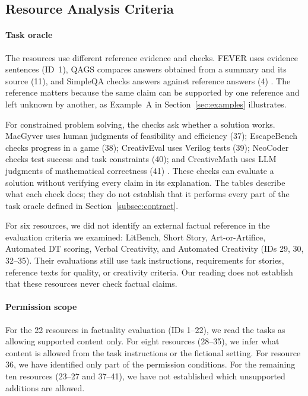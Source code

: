 \documentclass{clv2025}
\begin{document}
\subsection{Resource Analysis Criteria}\label{sec:mapping}

\paragraph{Task oracle}
The resources use different reference evidence and checks. FEVER uses
evidence sentences (ID~1), QAGS compares answers obtained from a summary
and its source (11), and SimpleQA checks answers against reference answers
(4) \citep{thorne_fever_2018,wang_asking_2020,wei_measuring_2024}.
The reference matters because the same claim can be supported by one
reference and left unknown by another, as Example~A in
Section~\ref{sec:examples} illustrates.

For constrained problem solving, the checks ask whether a solution works.
MacGyver uses human judgments of feasibility and efficiency (37);
EscapeBench checks progress in a game (38); CreativEval uses Verilog tests
(39); NeoCoder checks test success and task constraints (40); and
CreativeMath uses LLM judgments of mathematical correctness (41)
\citep{tian_macgyver_2025,qian_escapebench_2025,delorenzo_creativeval_2024,
lu_benchmarking_2025,ye_assessing_2025}. These checks can evaluate a solution
without verifying every claim in its explanation. The tables describe
what each check does; they do not establish that it performs every part
of the task oracle defined in Section~\ref{subsec:contract}.

For six resources, we did not identify an external factual reference in the
evaluation criteria we examined: LitBench, Short Story, Art-or-Artifice,
Automated DT scoring, Verbal Creativity, and Automated Creativity
(IDs 29, 30, 32--35). Their evaluations still use task instructions,
requirements for stories, reference texts for quality, or creativity
criteria. Our reading does not establish that these resources never check
factual claims.

\paragraph{Permission scope}
For the 22 resources in factuality evaluation (IDs 1--22), we read the tasks
as allowing supported content only. For eight resources (28--35), we infer
what content is allowed from the task instructions or the fictional setting.
For resource 36, we have identified only part of the permission conditions.
For the remaining ten resources (23--27 and 37--41), we have not established
which unsupported additions are allowed.
\end{document}
